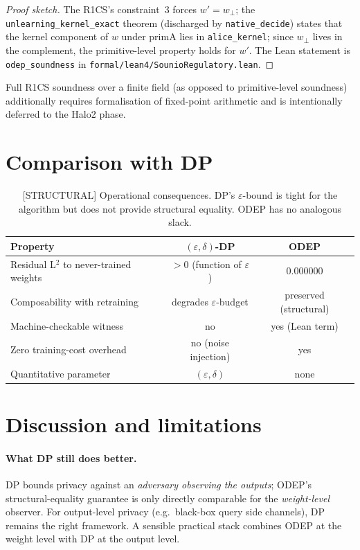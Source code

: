 \documentclass{article}
\begin{document}
\begin{proof}[Proof sketch]
The R1CS's constraint~3 forces $w' = w_\perp$; the
\texttt{unlearning\_kernel\_exact} theorem (discharged by
\texttt{native\_decide}) states that the kernel component of $w$ under
$\mathrm{primA}$ lies in \texttt{alice\_kernel}; since $w_\perp$ lives
in the complement, the primitive-level property holds for $w'$.  The
Lean statement is \texttt{odep\_soundness} in
\texttt{formal/lean4/SounioRegulatory.lean}.
\end{proof}

Full R1CS soundness over a finite field (as opposed to primitive-level
soundness) additionally requires formalisation of fixed-point
arithmetic and is intentionally deferred to the Halo2 phase.

\section{Comparison with DP}

\begin{table}[h]
\centering
\caption{[STRUCTURAL] Operational consequences.  DP's $\varepsilon$-bound is tight
         for the algorithm but does not provide structural equality.
         ODEP has no analogous slack.}
\label{tab:consequences}
\begin{tabular}{lcc}
\toprule
Property & $(\varepsilon, \delta)$-DP & ODEP \\
\midrule
Residual L${}^2$ to never-trained weights & $> 0$ (function of $\varepsilon$) & $\mathbf{0.000000}$ \\
Composability with retraining            & degrades $\varepsilon$-budget     & preserved (structural) \\
Machine-checkable witness                & no                                & yes (Lean term) \\
Zero training-cost overhead              & no (noise injection)              & yes \\
Quantitative parameter                   & $(\varepsilon, \delta)$           & none \\
\bottomrule
\end{tabular}
\end{table}

\section{Discussion and limitations}

\paragraph{What DP still does better.}  DP bounds privacy against an
\emph{adversary observing the outputs}; ODEP's structural-equality
guarantee is only directly comparable for the \emph{weight-level}
observer.  For output-level privacy (e.g.\ black-box query side
channels), DP remains the right framework.  A sensible practical
stack combines ODEP at the weight level with DP at the output level.
\end{document}
